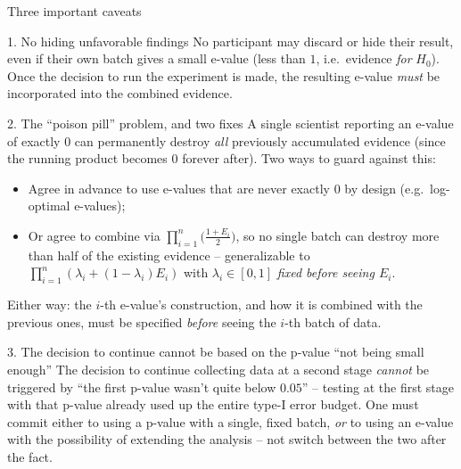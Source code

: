 \documentclass[aspectratio=169,10pt]{beamer}
\begin{document}
\begin{frame}[allowframebreaks]{Three important caveats}
  \begin{block}{1. No hiding unfavorable findings}
    No participant may discard or hide their result, even if their own batch
    gives a small e-value (less than $1$, i.e.\ evidence \emph{for} $H_0$).
    Once the decision to run the experiment is made, the resulting e-value
    \emph{must} be incorporated into the combined evidence.
  \end{block}

  \begin{block}{2. The ``poison pill'' problem, and two fixes}
    A single scientist reporting an e-value of exactly $0$ can permanently
    destroy \emph{all} previously accumulated evidence (since the running
    product becomes $0$ forever after). Two ways to guard against this:
    \begin{itemize}
      \item Agree in advance to use e-values that are never exactly $0$ by
      design (e.g.\ log-optimal e-values);
      \item Or agree to combine via
      $\prod_{i=1}^n\big(\tfrac{1+E_i}{2}\big)$, so no single batch can
      destroy more than half of the existing evidence -- generalizable to
      $\prod_{i=1}^n(\lambda_i+(1-\lambda_i)E_i)$ with $\lambda_i\in[0,1]$
      \emph{fixed before seeing $E_i$}.
    \end{itemize}
    Either way: the $i$-th e-value's construction, and how it is combined
    with the previous ones, must be specified \emph{before} seeing the
    $i$-th batch of data.
  \end{block}

  \framebreak
  \begin{block}{3. The decision to continue cannot be based on the p-value ``not being small enough''}
    The decision to continue collecting data at a second stage \emph{cannot}
    be triggered by ``the first p-value wasn't quite below $0.05$'' --
    testing at the first stage with that p-value already used up the entire
    type-I error budget. One must commit either to using a p-value with a
    single, fixed batch, \emph{or} to using an e-value with the possibility
    of extending the analysis -- not switch between the two after the fact.
  \end{block}
\end{frame}
\end{document}
